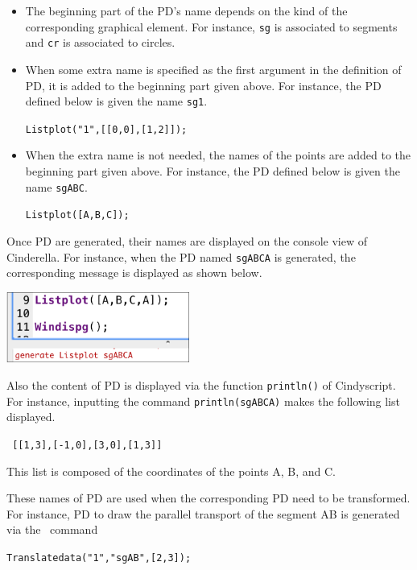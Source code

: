 \documentclass[papersize,a4paper,12pt]{article}
\begin{document}
\begin{itemize}
\item 
The beginning part of the PD's name 
depends on the kind of the corresponding graphical element. 
For instance, 
\verb|sg| is associated to segments and 
\verb|cr| is associated to circles. 

\item 
When some extra name is specified 
as the first argument in the definition of PD, 
it is added to the beginning part given above. 
For instance, the PD defined below 
is given the name \verb|sg1|. 
\begin{center}
\verb|Listplot("1",[[0,0],[1,2]]);| 
\end{center}

\item 
When the extra name is not needed, 
the names of the points are added 
to the beginning part given above. 
For instance, the PD defined below  
is given the name \verb|sgABC|. 
\begin{center}
\verb|Listplot([A,B,C]);|
\end{center}

\end{itemize}

\noindent 
Once PD are generated, 
their names are displayed on the console view of Cinderella. 
For instance, when the PD named \verb|sgABCA| is generated, 
the corresponding message is displayed as shown below. 

\begin{center}
\includegraphics[bb=0.00 0.00 298.02 115.01,width=6cm]{Fig/pdtoconsole.pdf}
\end{center}
Also the content of PD is displayed 
via the function \verb|println()| of Cindyscript. 
For instance, inputting the command 
\verb|println(sgABCA)| makes the following list displayed. 
\begin{center}
\verb| [[1,3],[-1,0],[3,0],[1,3]] |
\end{center}
This list is composed of the coordinates of the points A, B, and C. 

These names of PD are used 
when the corresponding PD need to be transformed. 
For instance, 
PD to draw the parallel transport of the segment AB 
is generated via the \ketcindy\ command 
\begin{center}
\verb|Translatedata("1","sgAB",[2,3]);|
\end{center}
\end{document}
